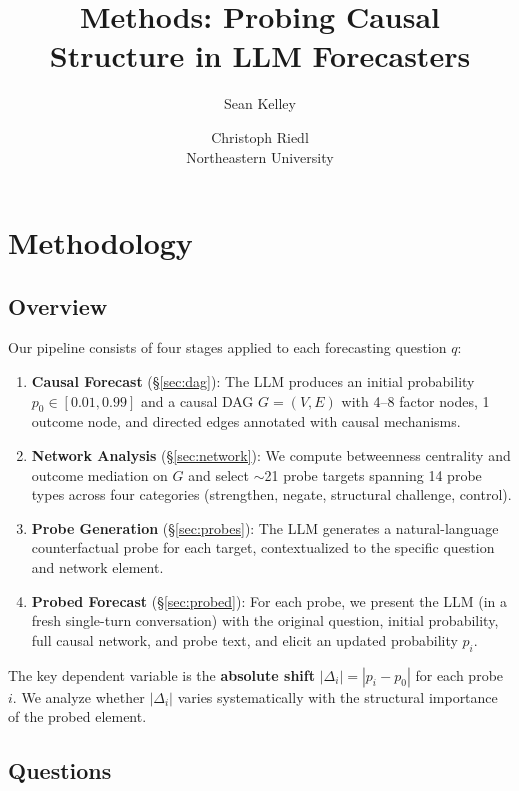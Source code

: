 \documentclass[11pt]{article}
\title{Methods: Probing Causal Structure in LLM Forecasters}
\author{
  Sean Kelley \and Christoph Riedl \\
  Northeastern University
}
\begin{document}
\maketitle

\section{Methodology}
\label{sec:method}

\subsection{Overview}

Our pipeline consists of four stages applied to each forecasting question $q$:

\begin{enumerate}
    \item \textbf{Causal Forecast} (\S\ref{sec:dag}): The LLM produces an initial probability $p_0 \in [0.01, 0.99]$ and a causal DAG $G = (V, E)$ with 4--8 factor nodes, 1 outcome node, and directed edges annotated with causal mechanisms.
    \item \textbf{Network Analysis} (\S\ref{sec:network}): We compute betweenness centrality and outcome mediation on $G$ and select ${\sim}$21 probe targets spanning 14 probe types across four categories (strengthen, negate, structural challenge, control).
    \item \textbf{Probe Generation} (\S\ref{sec:probes}): The LLM generates a natural-language counterfactual probe for each target, contextualized to the specific question and network element.
    \item \textbf{Probed Forecast} (\S\ref{sec:probed}): For each probe, we present the LLM (in a fresh single-turn conversation) with the original question, initial probability, full causal network, and probe text, and elicit an updated probability $p_i$.
\end{enumerate}

The key dependent variable is the \textbf{absolute shift} $|\Delta_i| = |p_i - p_0|$ for each probe $i$. We analyze whether $|\Delta_i|$ varies systematically with the structural importance of the probed element.

\subsection{Questions}
\end{document}
